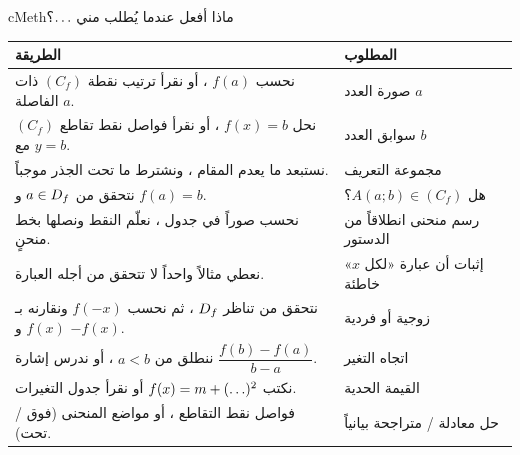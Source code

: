 \documentclass[12pt,a4paper]{article}
\newenvironment{BOX}[2]{\begin{otherlanguage}{english}\begin{arbox}{#1}{#2}}{\end{arbox}\end{otherlanguage}}
\renewcommand{\ldots}{\mathinner{\ldotp\ldotp\ldotp}}
\begin{document}
\begin{BOX}{cMeth}{ماذا أفعل عندما يُطلب مني $\ldots$؟}
\renewcommand{\arraystretch}{1.5}
\centering
\begin{tabular}{|p{}|p{}|}\hline
\cellcolor{cMeth!15}\textbf{الطريقة} & \cellcolor{cMeth!15}\textbf{المطلوب}\\\hline
نحسب $f(a)$ ، أو نقرأ ترتيب نقطة $(C_f)$ ذات الفاصلة $a$. & صورة العدد $a$\\\hline
نحل $f(x)=b$ ، أو نقرأ فواصل نقط تقاطع $(C_f)$ مع $y=b$. & سوابق العدد $b$\\\hline
نستبعد ما يعدم المقام ، ونشترط ما تحت الجذر موجباً. & مجموعة التعريف\\\hline
نتحقق من $a\in D_f$ و $f(a)=b$. & هل $A(a;b)\in(C_f)$؟\\\hline
نحسب صوراً في جدول ، نعلّم النقط ونصلها بخط منحنٍ. & رسم منحنى انطلاقاً من الدستور\\\hline
نعطي مثالاً واحداً لا تتحقق من أجله العبارة. & إثبات أن عبارة «لكل $x$» خاطئة\\\hline
نتحقق من تناظر $D_f$ ، ثم نحسب $f(-x)$ ونقارنه بـ $f(x)$ و $-f(x)$. & زوجية أو فردية\\\hline
ننطلق من $a<b$ ، أو ندرس إشارة $\dfrac{f(b)-f(a)}{b-a}$. & اتجاه التغير\\\hline
نكتب $f(x)=m+(\ldots)^2$ أو نقرأ جدول التغيرات. & القيمة الحدية\\\hline
فواصل نقط التقاطع ، أو مواضع المنحنى (فوق / تحت). & حل معادلة / متراجحة بيانياً\\\hline
\end{tabular}
\end{BOX}
\end{document}
